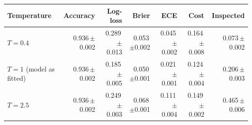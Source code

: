 \begin{tabular}{lrrrrrr}
\toprule
Temperature & Accuracy & Log-loss & Brier & ECE & Cost & Inspected \\
\midrule
$T=0.4$ & 0.936\,{\scriptsize$\pm$0.002} & 0.289\,{\scriptsize$\pm$0.013} & 0.053\,{\scriptsize$\pm$0.002} & 0.045\,{\scriptsize$\pm$0.002} & 0.164\,{\scriptsize$\pm$0.008} & 0.073\,{\scriptsize$\pm$0.002} \\
$T=1$ (model as fitted) & 0.936\,{\scriptsize$\pm$0.002} & 0.185\,{\scriptsize$\pm$0.005} & 0.050\,{\scriptsize$\pm$0.001} & 0.021\,{\scriptsize$\pm$0.001} & 0.124\,{\scriptsize$\pm$0.004} & 0.206\,{\scriptsize$\pm$0.003} \\
$T=2.5$ & 0.936\,{\scriptsize$\pm$0.002} & 0.249\,{\scriptsize$\pm$0.003} & 0.068\,{\scriptsize$\pm$0.001} & 0.111\,{\scriptsize$\pm$0.004} & 0.149\,{\scriptsize$\pm$0.002} & 0.465\,{\scriptsize$\pm$0.006} \\
\bottomrule
\end{tabular}
